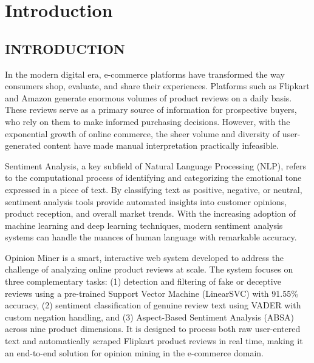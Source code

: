 \documentclass[12pt,a4paper]{report}
\begin{document}
\newpage
{}
\setcounter{page}{1}
\fancyfoot[C]{\thepage}

\chapter{Introduction}

\section{INTRODUCTION}

\noindent\hspace{1cm} In the modern digital era, e-commerce platforms have transformed the way consumers shop, evaluate, and share their experiences. Platforms such as Flipkart and Amazon generate enormous volumes of product reviews on a daily basis. These reviews serve as a primary source of information for prospective buyers, who rely on them to make informed purchasing decisions. However, with the exponential growth of online commerce, the sheer volume and diversity of user-generated content have made manual interpretation practically infeasible.

Sentiment Analysis, a key subfield of Natural Language Processing (NLP), refers to the computational process of identifying and categorizing the emotional tone expressed in a piece of text. By classifying text as positive, negative, or neutral, sentiment analysis tools provide automated insights into customer opinions, product reception, and overall market trends. With the increasing adoption of machine learning and deep learning techniques, modern sentiment analysis systems can handle the nuances of human language with remarkable accuracy.

Opinion Miner is a smart, interactive web system developed to address the challenge of analyzing online product reviews at scale. The system focuses on three complementary tasks: (1) detection and filtering of fake or deceptive reviews using a pre-trained Support Vector Machine (LinearSVC) with 91.55\% accuracy, (2) sentiment classification of genuine review text using VADER with custom negation handling, and (3) Aspect-Based Sentiment Analysis (ABSA) across nine product dimensions. It is designed to process both raw user-entered text and automatically scraped Flipkart product reviews in real time, making it an end-to-end solution for opinion mining in the e-commerce domain.
\end{document}
